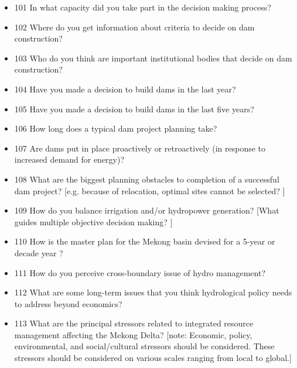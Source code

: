 \documentclass[11pt,english]{article}
\theoremstyle{plain} \newtheorem{claim}{Claim}
\theoremstyle{plain} \newtheorem{prop}{Proposition}
\theoremstyle{plain} \newtheorem{hypo}{Hypothesis}
\begin{document}
\begin{itemize}
\item[] 101 In what capacity did you take part in the decision making process? 

\item[] 102 Where do you get information about criteria to decide on dam construction? 
 
\item[] 103 Who do you think are important institutional bodies that decide on dam construction? 

\item[] 104 Have you made a decision to build dams in the last year? 

\item[] 105 Have you made a decision to build dams in the last five years?

\item[] 106 How long does a typical dam project planning take? 

\item[] 107 Are dams put in place proactively or retroactively (in response to increased demand for energy)?

\item[] 108 What are the biggest planning obstacles to completion of a successful dam project? [e.g. because of relocation, optimal sites cannot be selected? ]

\item[] 109 How do you balance irrigation and/or hydropower generation? 
[What guides multiple objective decision making?  ]

\item[] 110 How is the master plan for the Mekong basin devised for a 5-year or decade year ?

\item[] 111 How do you perceive cross-boundary issue of hydro management? 

\item[] 112 What are some long-term issues that you think hydrological policy needs to address beyond economics? 

\item[] 113 What are the principal stressors related to integrated resource management affecting the Mekong Delta? [note: Economic, policy, environmental, and social/cultural stressors should be considered. These stressors should be considered on various scales ranging from local to global.]

\end{itemize}
\end{document}
